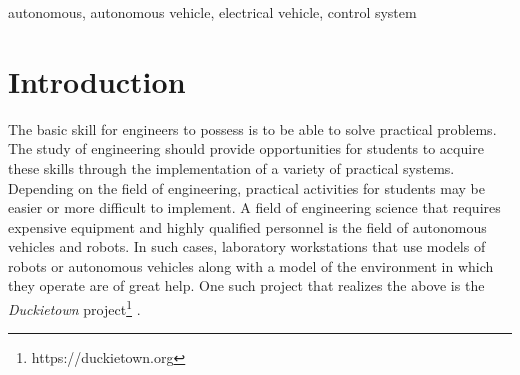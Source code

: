 \documentclass[conference]{IEEEtran}
\begin{document}
\begin{IEEEkeywords}
autonomous, autonomous vehicle, electrical vehicle, control system
\end{IEEEkeywords}
%
\section{Introduction}
The basic skill for engineers to possess is to be able to solve practical problems. The study of engineering should provide opportunities for students to acquire these skills through the implementation of a variety of practical systems. Depending on the field of engineering, practical activities for students may be easier or more difficult to implement. A field of engineering science that requires expensive equipment and highly qualified personnel is the field of autonomous vehicles and robots.
In such cases, laboratory workstations that use models of robots or autonomous vehicles along with a model of the environment in which they operate are of great help.
One such project that realizes the above is the \emph{Duckietown} project\footnote{https://duckietown.org} \cite{tani2017duckietown}.
\end{document}
